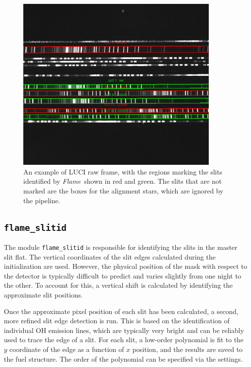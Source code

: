 \documentclass[a4paper]{article}
\newcommand{\flame}{\emph{Flame}}
\begin{document}
\begin{sloppypar}
\begin{figure}[htbp]
\centering
\includegraphics[width=0.9\textwidth]{slits}
\caption{An example of LUCI raw frame, with the regions marking the slits identified by \flame\ shown in red and green. The slits that are not marked are the boxes for the alignment stars, which are ignored by the pipeline.}
\label{fig:slits}
\end{figure}

\subsection{\texttt{flame\_slitid}}
\label{sec:slitid}

The module \texttt{flame\_slitid} is responsible for identifying the slits in the master slit flat. The vertical coordinates of the slit edges calculated during the initialization are used. However, the physical position of the mask with respect to the detector is typically difficult to predict and varies slightly from one night to the other. To account for this, a vertical shift is calculated by identifying the approximate slit positions.

Once the approximate pixel position of each slit has been calculated, a second, more refined slit edge detection is run. This is based on the identification of individual OH emission lines, which are typically very bright and can be reliably used to trace the edge of a slit. For each slit, a low-order polynomial is fit to the $y$ coordinate of the edge as a function of $x$ position, and the results are saved to the fuel structure. The order of the polynomial can be specified via the settings.


\end{sloppypar}
\end{document}
